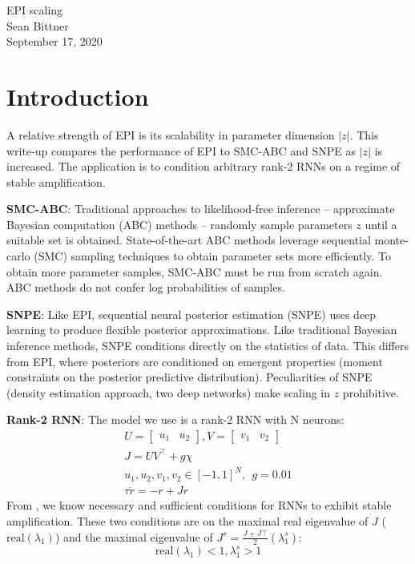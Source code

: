 \documentclass[11pt]{article}
\begin{document}
\medskip                        %


\thispagestyle{plain}
\begin{center}                  %
{\Large EPI scaling} \\
Sean Bittner \\
September 17, 2020 \\
\end{center}

\section{Introduction}
A relative strength of EPI is its scalability in parameter dimension $|z|$. 
This write-up compares the performance of EPI to SMC-ABC and SNPE as $|z|$ is increased.  
The application is to condition arbitrary rank-2 RNNs on a regime of stable amplification.

\textbf{SMC-ABC}: 
Traditional approaches to likelihood-free inference -- approximate Bayesian computation (ABC) methods -- randomly sample parameters $z$ until a suitable set is obtained.
State-of-the-art ABC methods leverage sequential monte-carlo (SMC) sampling techniques to obtain parameter sets more efficiently.
To obtain more parameter samples, SMC-ABC must be run from scratch again.
ABC methods do not confer log probabilities of samples.

\textbf{SNPE}: Like EPI, sequential neural posterior estimation (SNPE) uses deep learning to produce flexible posterior approximations.
Like traditional Bayesian inference methods, SNPE conditions directly on the statistics of data.
This differs from EPI, where posteriors are conditioned on emergent properties (moment constraints on the posterior predictive distribution).
Peculiarities of SNPE (density estimation approach, two deep networks) make scaling in $z$ prohibitive.

\textbf{Rank-2 RNN}: The model we use is a rank-2 RNN with N neurons:
\begin{equation*}
\begin{split}
U = \begin{bmatrix} u_1 & u_2 \end{bmatrix}, V = \begin{bmatrix} v_1 & v_2 \end{bmatrix} \\ J = UV^\top + g\chi \\
u_1, u_2, v_1, v_2 \in \left[-1, 1 \right]^N,~~ g = 0.01 \\
\tau \dot{r} = -r + Jr
\end{split}
\end{equation*}
From \cite{bondanelli2020coding}, we know necessary and sufficient conditions for RNNs to exhibit stable amplification.  These two conditions are on the maximal real eigenvalue of $J$ ($\text{real}(\lambda_1)$) and the maximal eigenvalue of $J^s = \frac{J + J\top}{2} (\lambda^s_1)$:
\[\text{real}(\lambda_1) < 1, \lambda^s_1 > 1\]
\end{document}
